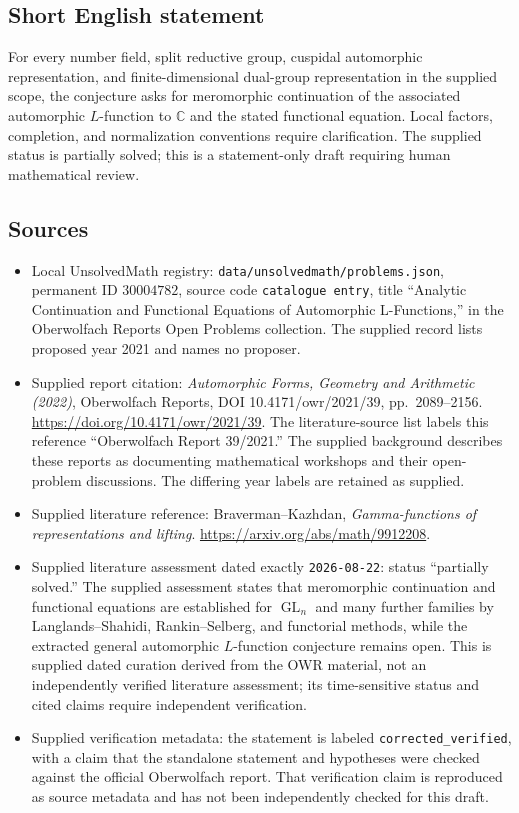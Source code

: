 \documentclass[11pt]{article}
\newcommand{\C}{\mathbb{C}}
\begin{document}
\subsection{Short English statement}
For every number field, split reductive group, cuspidal automorphic representation, and finite-dimensional dual-group representation in the supplied scope, the conjecture asks for meromorphic continuation of the associated automorphic \(L\)-function to \(\C\) and the stated functional equation. Local factors, completion, and normalization conventions require clarification. The supplied status is partially solved; this is a statement-only draft requiring human mathematical review.
\subsection{Sources}
\begin{itemize}
\item Local UnsolvedMath registry: \texttt{data/unsolvedmath/problems.json}, permanent ID \(30004782\), source code \texttt{catalogue entry}, title ``Analytic Continuation and Functional Equations of Automorphic L-Functions,'' in the Oberwolfach Reports Open Problems collection. The supplied record lists proposed year 2021 and names no proposer.
\item Supplied report citation: \emph{Automorphic Forms, Geometry and Arithmetic (2022)}, Oberwolfach Reports, DOI 10.4171/owr/2021/39, pp.\ 2089--2156. \url{https://doi.org/10.4171/owr/2021/39}. The literature-source list labels this reference ``Oberwolfach Report 39/2021.'' The supplied background describes these reports as documenting mathematical workshops and their open-problem discussions. The differing year labels are retained as supplied.
\item Supplied literature reference: Braverman--Kazhdan, \emph{Gamma-functions of representations and lifting}. \url{https://arxiv.org/abs/math/9912208}.
\item Supplied literature assessment dated exactly \texttt{2026-08-22}: status ``partially solved.'' The supplied assessment states that meromorphic continuation and functional equations are established for \(\operatorname{GL}_n\) and many further families by Langlands--Shahidi, Rankin--Selberg, and functorial methods, while the extracted general automorphic \(L\)-function conjecture remains open. This is supplied dated curation derived from the OWR material, not an independently verified literature assessment; its time-sensitive status and cited claims require independent verification.
\item Supplied verification metadata: the statement is labeled \texttt{corrected\_verified}, with a claim that the standalone statement and hypotheses were checked against the official Oberwolfach report. That verification claim is reproduced as source metadata and has not been independently checked for this draft.
\end{itemize}
\end{document}
